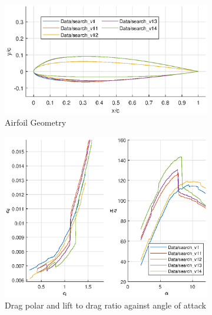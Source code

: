 \documentclass{article}
\begin{document}
\begin{figure}[H]
    \begin{subfigure}{0.54\textwidth}
        \centering
        \includegraphics[width=1.2\textwidth, center]{figures/hiRe_geometry_14.eps}
        \caption{Airfoil Geometry}
        \label{fig:v14_geometry}
    \end{subfigure}
    \begin{subfigure}{0.45\textwidth}
        \centering
        \includegraphics[width=1.2\textwidth, center]{figures/hiRe_lod_14.eps}
        \caption{Drag polar and lift to drag ratio against angle of attack}
        \label{fig:v14_lod}
    \end{subfigure}
    \caption{}
\end{figure}
\end{document}
